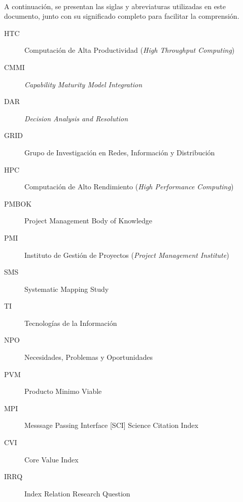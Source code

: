 \label{cap:siglas}
\mbox{}\\
A continuación, se presentan las siglas y abreviaturas utilizadas en este documento, junto con su significado completo para facilitar la comprensión.
\begin{description}
	\item[HTC] Computación de Alta Productividad (\textit{High Throughput Computing})
	\item[CMMI] \textit{Capability Maturity Model Integration}
	\item[DAR] \textit{Decision Analysis and Resolution}
	\item[GRID] Grupo de Investigación en Redes, Información y Distribución
	\item[HPC] Computación de Alto Rendimiento (\textit{High Performance Computing})
	\item[PMBOK] Project Management Body of Knowledge
	\item[PMI] Instituto de Gestión de Proyectos (\textit{Project Management Institute})
	\item[SMS] Systematic Mapping Study
	\item[TI] Tecnologías de la Información
	\item[NPO] Necesidades, Problemas y Oportunidades
	\item[PVM] Producto Minimo Viable
	\item[MPI] Messsage Passing Interface
		      [SCI] Science Citation Index
	\item [CVI] Core Value Index
	\item [IRRQ] Index Relation Research Question

\end{description}
